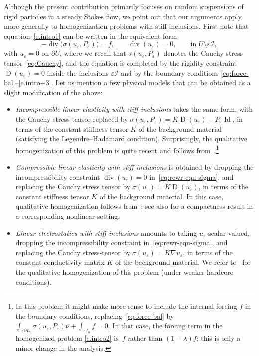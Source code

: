 \documentclass[10pt]{amsart}
\let\mathcal\mathscr
\theoremstyle{plain}
\theoremstyle{definition}
\newcommand{\e}{\varepsilon}
\newcommand{\Ic}{\mathcal I}
\newcommand{\Id}{\operatorname{Id}}
\newcommand{\D}{\operatorname{D}}
\newcommand{\Div}{{\operatorname{div}}}
\begin{document}
Although the present contribution primarily focuses on random suspensions of rigid particles in a steady Stokes flow, we point out
that our arguments apply more generally to homogenization problems with stiff inclusions.
First note that equation~\eqref{e.intro1} can be written in the equivalent form
\begin{equation}\label{eq:rewr-eqn-sigma}
-\Div\big(\sigma(u_\e,P_\e)\big)=f,\qquad\Div (u_\e)=0,\qquad\text{in $U\setminus \e\Ic$},
\end{equation}
with $u_\e=0$ on $\partial U$, where we recall that $\sigma(u_\e,P_\e)$ denotes the Cauchy stress tensor~\eqref{eq:Cauchy},
and the equation is completed by the rigidity constraint $\D(u_\e)=0$ inside the inclusions $\e\Ic$
and by the boundary conditions \eqref{eq:force-bal}--\eqref{e.intro+3}.
Let us mention a few physical models that can be obtained as a slight modification of the above:
\begin{itemize}
\item \emph{Incompressible linear elasticity with stiff inclusions} takes the same form, with the Cauchy stress tensor replaced by $\sigma(u_\e,P_\e)=K\D(u_\e)-P_\e\Id$,
in terms of the constant stiffness tensor $K$ of the background material (satisfying the Legendre--Hadamard condition).
Surprisingly, the qualitative homogenization of this problem is quite recent and follows from~\cite{DG-19}.\footnote{In this problem it might make more sense to include the internal forcing $f$ in the boundary conditions, replacing~\eqref{eq:force-bal} by $\int_{\e\partial I_n}\sigma(u_\e,P_\e)\nu+\int_{\e I_n} f=0$. In that case, the forcing term in the homogenized problem \eqref{e.intro2} is~$f$ rather than $(1-\lambda)f$; this is only a minor change in the analysis.}
\item \emph{Compressible linear elasticity with stiff inclusions} is obtained by dropping the incompressibility constraint $\Div (u_\e)=0$ in~\eqref{eq:rewr-eqn-sigma}, and replacing the Cauchy stress tensor by $\sigma(u_\e)=K\D(u_\e)$, in terms of the constant stiffness tensor $K$ of the background material.
In this case, qualitative homogenization follows from~\cite[Chap.\,3]{JKO94};
see also \cite{Braides-Garroni-95} for a compactness result in a corresponding nonlinear setting.
\item \emph{Linear electrostatics with stiff inclusions} amounts to taking $u_\e$ scalar-valued, dropping the incompressibility constraint in~\eqref{eq:rewr-eqn-sigma}, and replacing the Cauchy stress-tensor by $\sigma(u_\e)=K\nabla u_\e$, in terms of the constant conductivity matrix $K$ of the background material. We refer to~\cite[Chap.\,3]{JKO94} for the qualitative homogenization of this problem (under weaker hardcore conditions).
\end{itemize}
\end{document}

